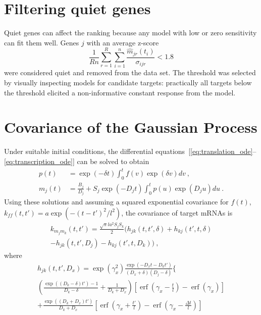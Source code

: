 \documentclass{pnastwo}
\newcommand{\erf}{\operatorname{erf}}
\begin{document}
\begin{article}
\begin{materials}
  \section{Filtering quiet genes}
  Quiet genes can affect the ranking because any model with low or zero sensitivity can fit them
  well. Genes $j$ with an average z-score 
  $$ \frac{1}{Rn} \sum_{r=1}^R \sum_{i=1}^n \frac{\hat{m}_{jr}(t_i)}{\sigma_{ijr}} < 1.8 $$
  were considered quiet and removed from the data set.  The threshold
  was selected by visually inspecting models for candidate targets:
  practically all targets below the threshold elicited a
  non-informative constant response from the model.
  
  \section{Covariance of the Gaussian Process}
  Under suitable initial conditions, the differential
  equations~[\ref{eq:translation_ode}--\ref{eq:transcription_ode}]
  can be solved to obtain
  \begin{align*}
    p(t) &= \exp(-\delta t) \int_0^t f(v) \exp(\delta v) dv\ , \\
    m_j(t) &= \frac{B_j}{D_j} + S_j \exp(-D_j t) \int_0^t p(u)
    \exp(D_j u) du\ .
  \end{align*}
  Using these solutions and assuming a squared exponential covariance
  for $f(t)$, $k_{ff}(t, t') = a \exp( -(t-t')^2/l^2)$, the covariance of target mRNAs is
  \begin{multline*}
    k_{m_j m_k}(t, t')
    = \frac{\sqrt{\pi} l a^2 S_j S_k}{2} \bigg(
    h_{jk}(t, t', \delta) + h_{kj}(t', t, \delta) \\
    - h_{jk}(t, t', D_j) - h_{kj}(t', t, D_k)
    \bigg)\ ,
  \end{multline*}
  where
  \begin{multline*}
    h_{jk}(t, t', D_x) = 
    \exp\left(\gamma_x^2\right)
    \frac{\exp(-D_x t - D_k t')}{(D_x + \delta) (D_j - \delta)}
    \bigg\{ 
    \\
    \left(\frac{\exp((D_k-\delta) t') - 1}{D_k-\delta} +
      \frac{1}{D_k + D_x} \right)
    \left[\erf\left(\gamma_x - \frac{t}{l}\right) - \erf\left(\gamma_x\right)\right]
    \\
    + \frac{\exp((D_k+D_x)t')}{D_k+D_x}
    \left[\erf\left(\gamma_x + \frac{t'}{l}\right)
    - \erf\left(\gamma_x - \frac{\Delta t}{l}\right)\right]

\end{multline*}
\end{materials}
\end{article}
\end{document}

